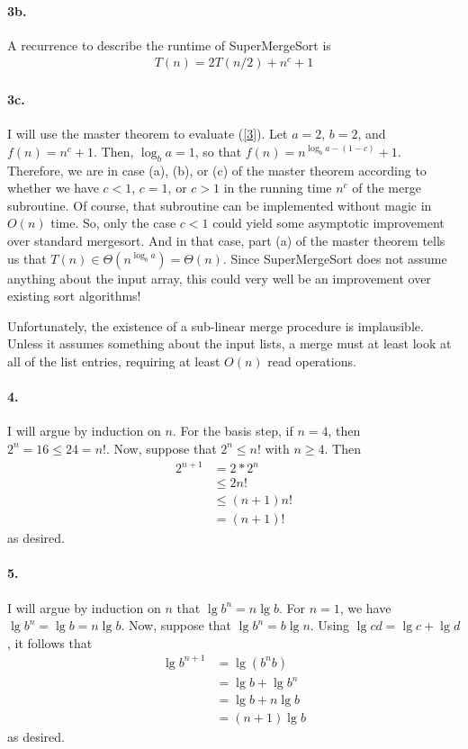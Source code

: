 \documentclass[
]{article}
\begin{document}
\paragraph{3b.} A recurrence to describe the runtime of SuperMergeSort is
\begin{align}
  \label{3}
  T(n) = 2T(n/2) + n^c + 1
\end{align}

\paragraph{3c.} I will use the master theorem to evaluate (\ref{3}).  Let $a=2$, $b=2$, and $f(n) = n^c+1$.  Then, $\log_ba=1$, so that $f(n) = n^{\log_ba - (1 - c)} + 1$.  Therefore, we are in case (a), (b), or (c) of the master theorem according to whether we have $c<1$, $c=1$, or $c>1$ in the running time $n^c$ of the merge subroutine.  Of course, that subroutine can be implemented without magic in $O(n)$ time.  So, only the case $c<1$ could yield some asymptotic improvement over standard mergesort.  And in that case, part (a) of the master theorem tells us that $T(n)\in \Theta(n^{\log_b a}) = \Theta(n)$.  Since SuperMergeSort does not assume anything about the input array, this could very well be an improvement over existing sort algorithms!

Unfortunately, the existence of a sub-linear merge procedure is implausible.  Unless it assumes something about the input lists, a merge must at least look at all of the list entries, requiring at least $O(n)$ read operations.


\paragraph{4.}  %
I will argue by induction on $n$.  
For the basis step, if $n=4$, then $2^n=16 \leq 24 = n!$.  
Now, suppose that $2^n\leq n!$ with $n\geq 4$.  
Then
\begin{align*}
  2^{n+1} &= 2* 2^n
  \\
  &\leq 2 n!
  \\
  &\leq (n+1)n!
  \\
  &= (n+1)!
\end{align*}
 as desired.

\paragraph{5.} %
I will argue by induction on $n$ that $\lg b^n = n\lg b$.  For $n=1$, we have $\lg b^n = \lg b = n \lg b$.  Now, suppose that $\lg b^n = b\lg n$.  
Using $\lg cd = \lg c + \lg d$, it follows that 
\begin{align*}
  \lg b^{n+1} &= \lg (b^nb)
  \\
  &= \lg b + \lg b^n
  \\
  &=
  \lg b + n\lg b
  \\
  &= (n+1)\lg b 
\end{align*}
as desired.
\end{document}
